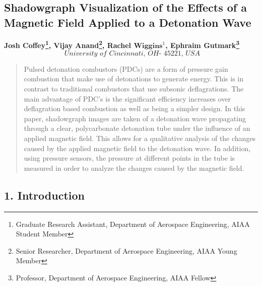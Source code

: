 \documentclass[preview,12pt]{article}
\begin{document}
\begin{center}
    \section*{Shadowgraph Visualization of the Effects of a Magnetic Field Applied to a Detonation Wave}
    \textbf{Josh Coffey\footnote{Graduate Research Assistant, Department of Aerospace Engineering, AIAA Student Member}, Vijay Anand\footnote{Senior Researcher, Department of Aerospace Engineering, AIAA Young Member}, Rachel $\textbf{Wiggins}^1$, Ephraim Gutmark\footnote{Professor, Department of Aerospace Engineering, AIAA Fellow}}
    $$\textit{ University of Cincinnati, OH- 45221, USA}$$
\end{center}


\begin{abstract}
    Pulsed detonation combustors (PDCs) are a form of pressure gain combustion that make use of detonations to generate energy.  This is in contrast to traditional combustors that use subsonic deflagrations.  The main advantage of PDC’s is the significant efficiency increases over deflagration based combustion as well as being a simpler design.  In this paper, shadowgraph images are taken of a detonation wave propagating through a clear, polycarbonate detonation tube under the influence of an applied magnetic field.  This allows for a qualitative analysis of the changes caused by the  applied magnetic field to the detonation wave.  In addition, using pressure sensors, the pressure at different points in the tube is measured in order to analyze the changes caused by the magnetic field.
\end{abstract}

\begin{center}
    \section*{\footnotesize{1.  Introduction}}
\end{center}
\end{document}
